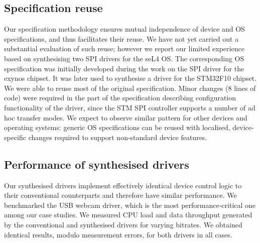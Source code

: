 \subsection{Specification reuse}  
Our specification methodology ensures mutual independence of device and OS specifications, and thus facilitates their reuse.  We have not yet carried out a substantial evaluation of such reuse; however we report our limited experience based on synthesising two SPI drivers for the seL4 OS\@.  The corresponding OS specification was initially developed during the work on the SPI driver for the exynos chipset.  It was later used to synthesise a driver for the STM32F10 chipset.  We were able to reuse most of the original specification.  Minor changes (8 lines of code) were required in the part of the specification describing configuration functionality of the driver, since the STM SPI controller supports a number of ad hoc transfer modes.  We expect to observe similar pattern for other devices and operating systems: generic OS specifications can be reused with localised, device-specific changes required to support non-standard device features.

\subsection{Performance of synthesised drivers} 
Our synthesised drivers implement effectively identical device control logic to their conventional counterparts and therefore have similar performance.  We benchmarked the USB webcam driver, which is the most performance-critical one among our case studies.  We measured CPU load and data throughput generated by the conventional and synthesised drivers for varying bitrates.  We obtained identical results, modulo measurement errors, for both drivers in all cases.

